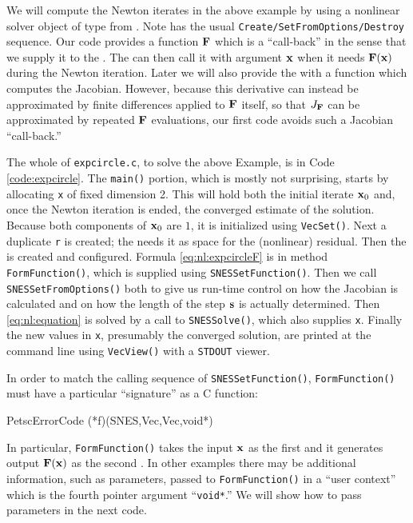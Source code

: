 We will compute the Newton iterates in the above example by using a nonlinear solver object of type \pSNES{} from \PETSc.  Note \pSNES has the usual \texttt{Create/SetFromOptions/Destroy} sequence.  Our code provides a function $\mathbf{F}$ which is a ``call-back'' in the sense that we supply it to the \pSNES.  The \pSNES can then call it with argument $\mathbf{x}$ when it needs $\mathbf{F}(\mathbf{x})$ during the Newton iteration.  Later we will also provide the \pSNES with a function which computes the Jacobian.  However, because this derivative can instead be approximated by finite differences applied to $\mathbf{F}$ itself, so that $J_{\mathbf{F}}$ can be approximated by repeated $\mathbf{F}$ evaluations, our first code avoids such a Jacobian ``call-back.''

The whole of \texttt{expcircle.c}, to solve the above Example, is in Code \ref{code:expcircle}.  The \texttt{main()} portion, which is mostly not surprising, starts by allocating \pVec \texttt{x} of fixed dimension 2.  This will hold both the initial iterate $\mathbf{x}_0$ and, once the Newton iteration is ended, the converged estimate of the solution.  Because both components of $\mathbf{x}_0$ are $1$, it is initialized using \texttt{VecSet()}.  Next a duplicate \pVec \texttt{r} is created; the \pSNES needs it as space for the (nonlinear) residual.  Then the \pSNES is created and configured.  Formula \eqref{eq:nl:expcircleF} is in method \texttt{FormFunction()}, which is supplied using \texttt{SNESSetFunction()}.  Then we call \texttt{SNESSetFromOptions()} both to give us run-time control on how the Jacobian is calculated and on how the length of the step $\mathbf{s}$ is actually determined.  Then \eqref{eq:nl:equation} is solved by a call to \texttt{SNESSolve()}, which also supplies \pVec \texttt{x}.  Finally the new values in \texttt{x}, presumably the converged solution, are printed at the command line using \texttt{VecView()} with a \texttt{STDOUT} viewer.

\vfill
{}

In order to match the calling sequence of \texttt{SNESSetFunction()}, \texttt{FormFunction()} must have a particular ``signature'' as a C function:
\begin{code}
PetscErrorCode (*f)(SNES,Vec,Vec,void*)
\end{code}
In particular, \texttt{FormFunction()} takes the input $\mathbf{x}$ as the first \pVec and it generates output $\mathbf{F}(\mathbf{x})$ as the second \pVec.  In other examples there may be additional information, such as parameters, passed to \texttt{FormFunction()} in a ``user context'' which is the fourth pointer argument ``\texttt{void*}.''  We will show how to pass parameters in the next code.

